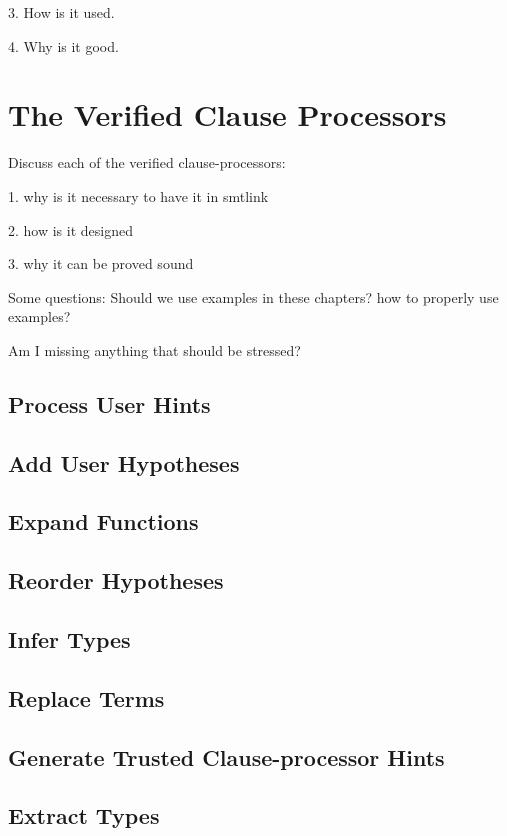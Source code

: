 3. How is it used.

4. Why is it good.

\section{The Verified Clause Processors}
Discuss each of the verified clause-processors:

1. why is it necessary to have it in smtlink

2. how is it designed

3. why it can be proved sound

Some questions: Should we use examples in these chapters? how to properly use
examples?

Am I missing anything that should be stressed?

\subsection{Process User Hints}

\subsection{Add User Hypotheses}

\subsection{Expand Functions}

\subsection{Reorder Hypotheses}

\subsection{Infer Types}

\subsection{Replace Terms}

\subsection{Generate Trusted Clause-processor Hints}

\subsection{Extract Types}
